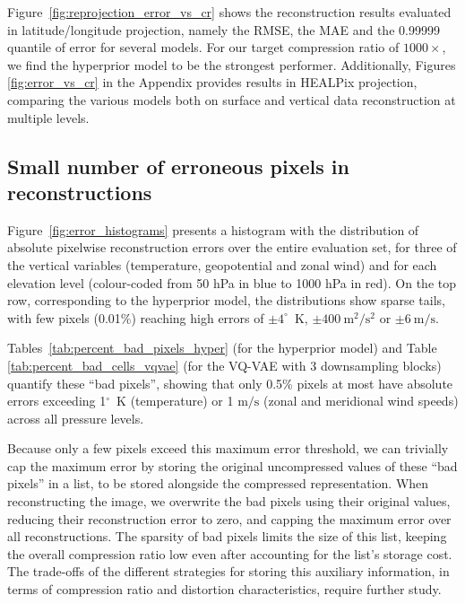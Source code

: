 Figure~\ref{fig:reprojection_error_vs_cr} shows the reconstruction results evaluated in latitude/longitude projection, namely the RMSE, the MAE and the 0.99999 quantile of error for several models. For our target compression ratio of $1000 \times$, we find the hyperprior model to be the strongest performer. Additionally, Figures \ref{fig:error_vs_cr} in the Appendix provides results in HEALPix projection, comparing the various models both on surface and vertical data reconstruction at multiple levels.   

\subsection{Small number of erroneous pixels in reconstructions}
\label{sx:experiments:bad-pixels}

Figure~\ref{fig:error_histograms} presents a histogram with the distribution of absolute pixelwise reconstruction errors over the entire evaluation set, for three of the vertical variables (temperature, geopotential and zonal wind) and for each elevation level (colour-coded from 50 hPa in blue to 1000 hPa in red). On the top row, corresponding to the hyperprior model, the distributions show sparse tails, with few pixels (0.01\%) reaching high errors of $\pm 4^\circ$~K, $\pm 400~\text{m}^2/\text{s}^2$ or $\pm 6~\text{m}/\text{s}$.

Tables~\ref{tab:percent_bad_pixels_hyper} (for the hyperprior model) and Table \ref{tab:percent_bad_cells_vqvae} (for the VQ-VAE with 3 downsampling blocks) quantify these ``bad pixels'', showing that only 0.5\% pixels at most have absolute errors exceeding 1$^\circ$~K (temperature) or 1 $\text{m}/\text{s}$ (zonal and meridional wind speeds) across all pressure levels.

Because only a few pixels exceed this maximum error threshold, we can trivially cap the maximum error by storing the original uncompressed values of these ``bad pixels'' in a list, to be stored alongside the compressed representation. When reconstructing the image, we overwrite the bad pixels using their original values, reducing their reconstruction error to zero, and capping the maximum error over all reconstructions. The sparsity of bad pixels limits the size of this list, keeping the overall compression ratio low even after accounting for the list's storage cost. The trade-offs of the different strategies for storing this auxiliary information, in terms of compression ratio and distortion characteristics, require further study.

